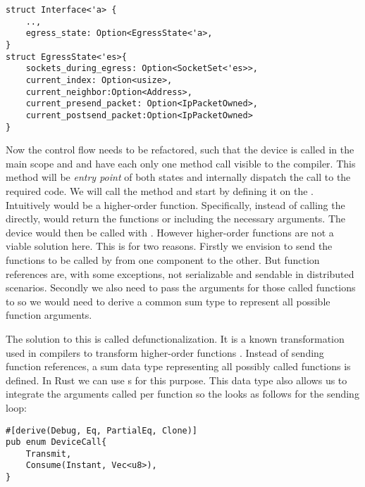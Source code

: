 
\begin{verbatim}
struct Interface<'a> {
    ..,
    egress_state: Option<EgressState<'a>,
}
struct EgressState<'es>{
    sockets_during_egress: Option<SocketSet<'es>>,
    current_index: Option<usize>,
    current_neighbor:Option<Address>,
    current_presend_packet: Option<IpPacketOwned>,
    current_postsend_packet:Option<IpPacketOwned>
}
\end{verbatim}

Now the control flow needs to be refactored, such that the device is called in the main scope and \dev{} and \stack{} have each only one method call visible to the compiler. This method will be \emph{entry point} of both states and internally dispatch the call to the required code. We will call the method  and start by defining it on the \dev{}. \\

Intuitively  would be a higher-order function. Specifically, instead of calling the \dev{} directly,  would return the functions  or  including the necessary arguments. The device would then be called with . However higher-order functions are not a viable solution here. This is for two reasons. Firstly we envision to send the functions to be called by  from one component to the other. But function references are, with some exceptions, not serializable and sendable in distributed scenarios. Secondly we also need to pass the arguments for those called functions to  so we would need to derive a common sum type to represent all possible function arguments.

The solution to this is called defunctionalization. It is a known transformation used in compilers to transform higher-order functions \cite{reynolds1972definitional}. Instead of sending function references, a sum data type representing all possibly called functions is defined. In Rust we can use s for this purpose. This  data type also allows us to integrate the arguments called per function so the  looks as follows for the sending loop: 
\begin{verbatim}
#[derive(Debug, Eq, PartialEq, Clone)]
pub enum DeviceCall{
    Transmit,
    Consume(Instant, Vec<u8>),
}
\end{verbatim}

